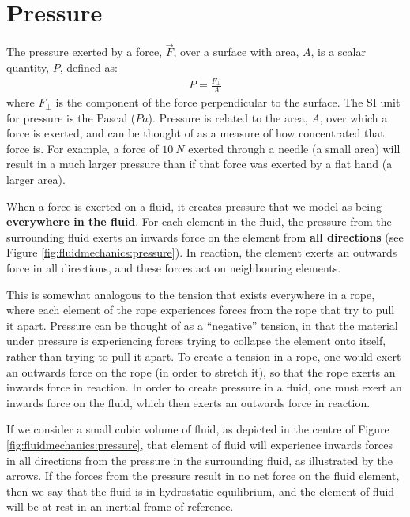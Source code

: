 \section{Pressure}
The pressure exerted by a force, $\vec F$, over a surface with area, $A$, is a scalar quantity, $P$, defined as:
\begin{align*}
P=\frac{F_\perp}{A}
\end{align*}
where $F_\perp$ is the component of the force perpendicular to the surface. The SI unit for pressure is the Pascal ($\si{Pa}$). Pressure is related to the area, $A$, over which a force is exerted, and can be thought of as a measure of how concentrated that force is. For example, a force of $\SI{10}{N}$ exerted through a needle (a small area) will result in a much larger pressure than if that force was exerted by a flat hand (a larger area). 


When a force is exerted on a fluid, it creates pressure that we model as being \textbf{everywhere in the fluid}.
For each element in the fluid, the pressure from the surrounding fluid exerts an inwards force on the element from \textbf{all directions} (see Figure \ref{fig:fluidmechanics:pressure}). In reaction, the element exerts an outwards force in all directions, and these forces act on neighbouring elements. 

This is somewhat analogous to the tension that exists everywhere in a rope, where each element of the rope experiences forces from the rope that try to pull it apart. Pressure can be thought of as a ``negative'' tension, in that the material under pressure is experiencing forces trying to collapse the element onto itself, rather than trying to pull it apart. To create a tension in a rope, one would exert an outwards force on the rope (in order to stretch it), so that the rope exerts an inwards force in reaction. In order to create pressure in a fluid, one must exert an inwards force on the fluid, which then exerts an outwards force in reaction.


If we consider a small cubic volume of fluid, as depicted in the centre of Figure \ref{fig:fluidmechanics:pressure}, that element of fluid will experience inwards forces in all directions from the pressure in the surrounding fluid, as illustrated by the arrows. If the forces from the pressure result in no net force on the fluid element, then we say that the fluid is in hydrostatic equilibrium, and the element of fluid will be at rest in an inertial frame of reference.


